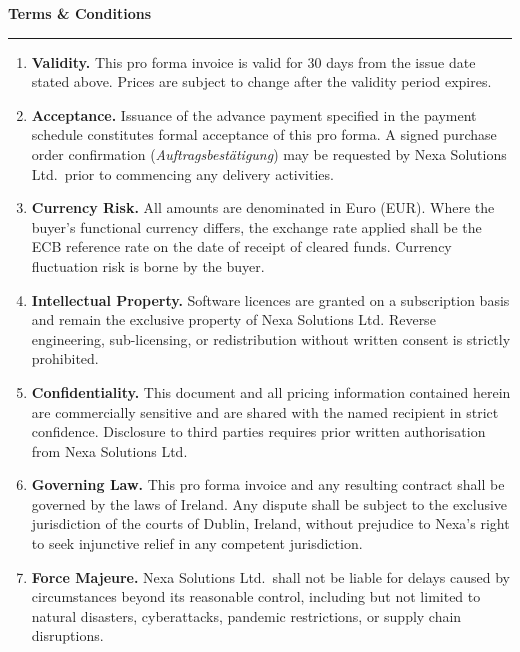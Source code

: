 \documentclass[11pt,a4paper]{article}
\newcommand{\sectionrule}{%
  \noindent\textcolor{NexaTeal}{\rule{\linewidth}{1.5pt}}%
}
\begin{document}
\par\vspace{7mm}

{\color{NexaNavy}\large\bfseries Terms \& Conditions}
\par\vspace{2mm}
\sectionrule
\par\vspace{4mm}

\begin{enumerate}[leftmargin=*, label=\textbf{\arabic{enumi}.}, itemsep=3pt]
  \item \textbf{Validity.} This pro forma invoice is valid for 30 days from the issue date stated
    above. Prices are subject to change after the validity period expires.

  \item \textbf{Acceptance.} Issuance of the advance payment specified in the payment schedule
    constitutes formal acceptance of this pro forma. A signed purchase order confirmation
    (\textit{Auftragsbestätigung}) may be requested by Nexa Solutions Ltd.\ prior to commencing
    any delivery activities.

  \item \textbf{Currency Risk.} All amounts are denominated in Euro (EUR). Where the buyer's
    functional currency differs, the exchange rate applied shall be the ECB reference rate on
    the date of receipt of cleared funds. Currency fluctuation risk is borne by the buyer.

  \item \textbf{Intellectual Property.} Software licences are granted on a subscription basis
    and remain the exclusive property of Nexa Solutions Ltd. Reverse engineering, sub-licensing,
    or redistribution without written consent is strictly prohibited.

  \item \textbf{Confidentiality.} This document and all pricing information contained herein
    are commercially sensitive and are shared with the named recipient in strict confidence.
    Disclosure to third parties requires prior written authorisation from Nexa Solutions Ltd.

  \item \textbf{Governing Law.} This pro forma invoice and any resulting contract shall be
    governed by the laws of Ireland. Any dispute shall be subject to the exclusive jurisdiction
    of the courts of Dublin, Ireland, without prejudice to Nexa's right to seek injunctive
    relief in any competent jurisdiction.

  \item \textbf{Force Majeure.} Nexa Solutions Ltd.\ shall not be liable for delays caused by
    circumstances beyond its reasonable control, including but not limited to natural disasters,
    cyberattacks, pandemic restrictions, or supply chain disruptions.
\end{enumerate}
\end{document}
